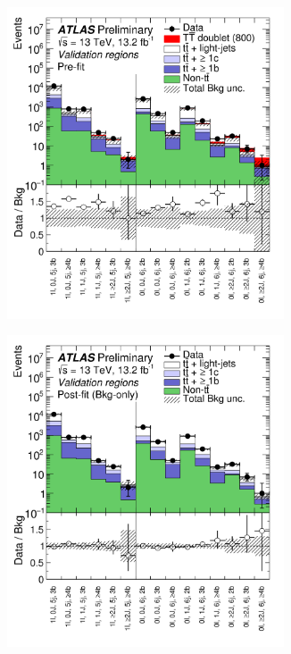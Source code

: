 \begin{figure}[p!]
\begin{subfigure}{0.5\textwidth}
  \centering
  \includegraphics[width=0.9\textwidth]{figures/VLQ/fig_14a.png}
  \caption{}
  \label{}
\end{subfigure}
\begin{subfigure}{0.5\textwidth}
  \centering
  \includegraphics[width=0.9\textwidth]{figures/VLQ/fig_14b.png}

\end{subfigure}
\end{figure}
